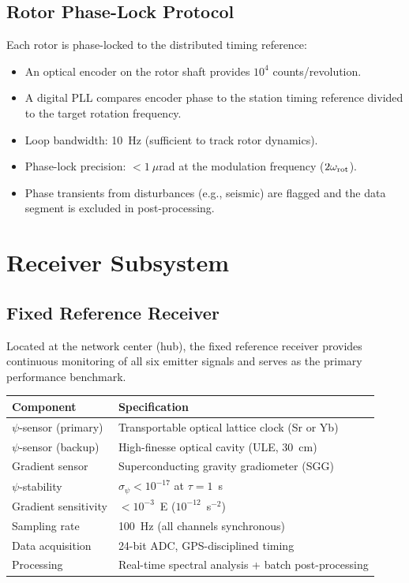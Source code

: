 \documentclass[11pt,a4paper]{article}
\begin{document}
\subsection{Rotor Phase-Lock Protocol}

Each rotor is phase-locked to the distributed timing reference:
\begin{itemize}
\item An optical encoder on the rotor shaft provides $10^4$
  counts/revolution.
\item A digital PLL compares encoder phase to the station timing reference
  divided to the target rotation frequency.
\item Loop bandwidth: 10~Hz (sufficient to track rotor dynamics).
\item Phase-lock precision: $< 1~\mu$rad at the modulation frequency
  ($2\omega_{\rm rot}$).
\item Phase transients from disturbances (e.g., seismic) are flagged
  and the data segment is excluded in post-processing.
\end{itemize}

\section{Receiver Subsystem}

\subsection{Fixed Reference Receiver}

Located at the network center (hub), the fixed reference receiver
provides continuous monitoring of all six emitter signals and serves
as the primary performance benchmark.

\begin{longtable}{p{5cm}p{8cm}}
\toprule
\textbf{Component} & \textbf{Specification} \\
\midrule
\endfirsthead
$\psi$-sensor (primary) & Transportable optical lattice clock (Sr or Yb) \\
$\psi$-sensor (backup) & High-finesse optical cavity (ULE, 30~cm) \\
Gradient sensor & Superconducting gravity gradiometer (SGG) \\
$\psi$-stability & $\sigma_\psi < 10^{-17}$ at $\tau = 1$~s \\
Gradient sensitivity & $< 10^{-3}$~E ($10^{-12}$~s$^{-2}$) \\
Sampling rate & 100~Hz (all channels synchronous) \\
Data acquisition & 24-bit ADC, GPS-disciplined timing \\
Processing & Real-time spectral analysis + batch post-processing \\
\bottomrule
\end{longtable}
\end{document}
